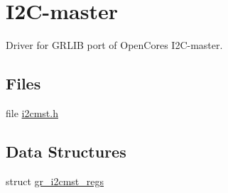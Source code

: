 \hypertarget{group__i2c}{}\section{I2\+C-\/master}
\label{group__i2c}


Driver for G\+R\+L\+IB port of Open\+Cores I2\+C-\/master.  


\subsection*{Files}
\begin{DoxyCompactItemize}
\item 
file \mbox{\hyperlink{i2cmst_8h}{i2cmst.\+h}}
\end{DoxyCompactItemize}
\subsection*{Data Structures}
\begin{DoxyCompactItemize}
\item 
struct \mbox{\hyperlink{structgr__i2cmst__regs}{gr\+\_\+i2cmst\+\_\+regs}}
\end{DoxyCompactItemize}
